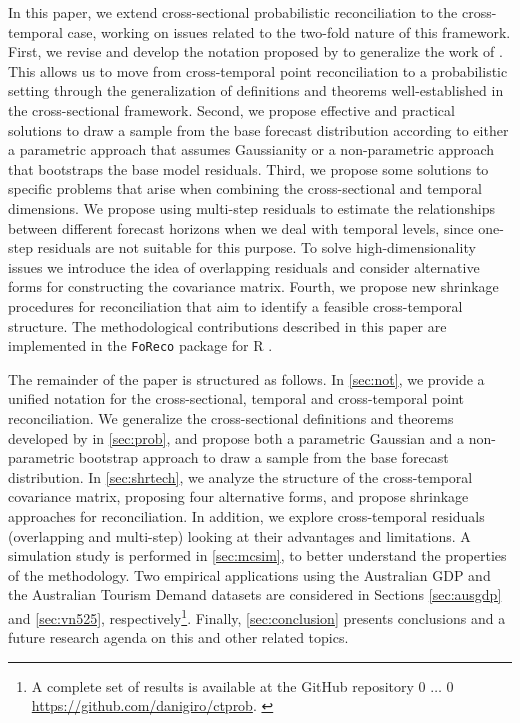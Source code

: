 \documentclass[12pt]{article}
\newcommand{\blind}{0}
\theoremstyle{definition}
\newcommand{\githuburl}{\begingroup%
\if1\blind
{
$\dots$
}\fi
\if0\blind
{
\url{https://github.com/danigiro/ctprob}.
}\fi
\endgroup}
\begin{document}
In this paper, we extend cross-sectional probabilistic reconciliation to the cross-temporal case, working on issues related to the two-fold nature of this framework. First, we revise and develop the notation proposed by \cite{difonzo2023} to generalize the work of \cite{panagiotelis2023}. This allows us to move from cross-temporal point reconciliation to a probabilistic setting through the generalization of definitions and theorems well-established in the cross-sectional framework. Second, we propose effective and practical solutions to draw a sample from the base forecast distribution according to either a parametric approach that assumes Gaussianity or a non-parametric approach that bootstraps the base model residuals. Third, we propose some solutions to specific problems that arise when combining the cross-sectional and temporal dimensions. We propose using multi-step residuals to estimate the relationships between different forecast horizons when we deal with temporal levels, since one-step residuals are not suitable for this purpose. To solve high-dimensionality issues we introduce the idea of overlapping residuals and consider alternative forms for constructing the covariance matrix. Fourth, we propose new shrinkage procedures for reconciliation that aim to identify a feasible cross-temporal structure. The methodological contributions described in this paper are implemented in the \texttt{FoReco} package for R \citep{foreco2023}.

The remainder of the paper is structured as follows. In \autoref{sec:not}, we provide a unified notation for the cross-sectional, temporal and cross-temporal point reconciliation. We generalize the cross-sectional definitions and theorems developed by \cite{panagiotelis2023} in \autoref{sec:prob}, and propose both a parametric Gaussian and a non-parametric bootstrap approach to draw a sample from the base forecast distribution. In \autoref{sec:shrtech}, we analyze the structure of the cross-temporal covariance matrix, proposing four alternative forms, and propose shrinkage approaches for reconciliation. In addition, we explore cross-temporal residuals (overlapping and multi-step) looking at their advantages and limitations. A simulation study is performed in \autoref{sec:mcsim}, to better understand the properties of the methodology. Two empirical applications using the Australian GDP and the Australian Tourism Demand datasets are considered in Sections \ref{sec:ausgdp} and \ref{sec:vn525}, respectively\footnote{A complete set of results is available at the GitHub repository \githuburl}. Finally, \autoref{sec:conclusion} presents conclusions and a future research agenda on this and other related topics.
\end{document}

